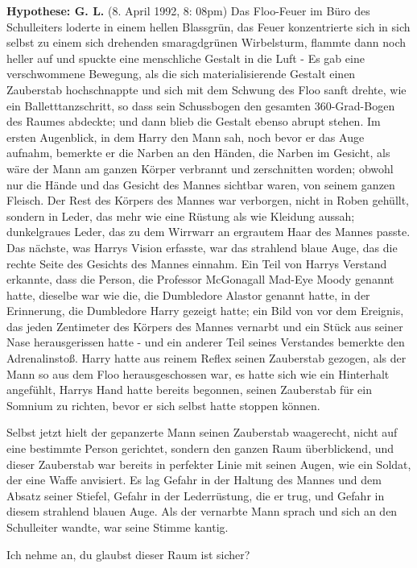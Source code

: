 \textbf{Hypothese: G. L. }(8. April 1992, 8: 08pm) Das Floo-Feuer im Büro des
Schulleiters loderte in einem hellen Blassgrün, das Feuer konzentrierte sich in
sich selbst zu einem sich drehenden smaragdgrünen Wirbelsturm, flammte dann noch
heller auf und spuckte eine menschliche Gestalt in die Luft - Es gab eine
verschwommene Bewegung, als die sich materialisierende Gestalt einen Zauberstab
hochschnappte und sich mit dem Schwung des Floo sanft drehte, wie ein
Balletttanzschritt, so dass sein Schussbogen den gesamten 360-Grad-Bogen des
Raumes abdeckte; und dann blieb die Gestalt ebenso abrupt stehen. Im ersten
Augenblick, in dem Harry den Mann sah, noch bevor er das Auge aufnahm, bemerkte
er die Narben an den Händen, die Narben im Gesicht, als wäre der Mann am ganzen
Körper verbrannt und zerschnitten worden; obwohl nur die Hände und das Gesicht
des Mannes sichtbar waren, von seinem ganzen Fleisch. Der Rest des Körpers des
Mannes war verborgen, nicht in Roben gehüllt, sondern in Leder, das mehr wie
eine Rüstung als wie Kleidung aussah; dunkelgraues Leder, das zu dem Wirrwarr an
ergrautem Haar des Mannes passte. Das nächste, was Harrys Vision erfasste, war
das strahlend blaue Auge, das die rechte Seite des Gesichts des Mannes einnahm.
Ein Teil von Harrys Verstand erkannte, dass die Person, die Professor McGonagall
\glqq Mad-Eye Moody\grqq{} genannt hatte, dieselbe war wie die, die Dumbledore
\glqq Alastor\grqq{} genannt hatte, in der Erinnerung, die Dumbledore Harry
gezeigt hatte; ein Bild von vor dem Ereignis, das jeden Zentimeter des Körpers
des Mannes vernarbt und ein Stück aus seiner Nase herausgerissen hatte - und ein
anderer Teil seines Verstandes bemerkte den Adrenalinstoß. Harry hatte aus
reinem Reflex seinen Zauberstab gezogen, als der Mann so aus dem Floo
herausgeschossen war, es hatte sich wie ein Hinterhalt angefühlt, Harrys Hand
hatte bereits begonnen, seinen Zauberstab für ein Somnium zu richten, bevor er
sich selbst hatte stoppen können.

Selbst jetzt hielt der gepanzerte Mann seinen Zauberstab waagerecht, nicht auf
eine bestimmte Person gerichtet, sondern den ganzen Raum überblickend, und
dieser Zauberstab war bereits in perfekter Linie mit seinen Augen, wie ein
Soldat, der eine Waffe anvisiert. Es lag Gefahr in der Haltung des Mannes und
dem Absatz seiner Stiefel, Gefahr in der Lederrüstung, die er trug, und Gefahr
in diesem strahlend blauen Auge. Als der vernarbte Mann sprach und sich an den
Schulleiter wandte, war seine Stimme kantig.

\glqq Ich nehme an, du glaubst dieser Raum ist sicher?\grqq{}

